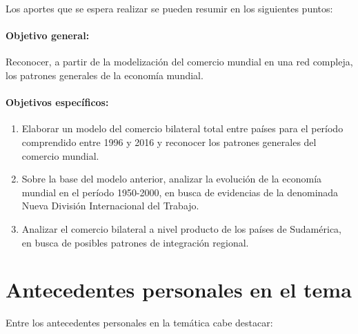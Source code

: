 \documentclass[runningheads,a4paper]{llncs}
\begin{document}
Los aportes que se espera realizar se pueden resumir en los siguientes puntos:

\par

\paragraph{\textbf{Objetivo general:}} Reconocer, a partir de la modelización del comercio mundial en una red compleja, los patrones generales de la economía mundial.

\par

\paragraph{\textbf{Objetivos específicos:}}

\begin{enumerate}
	\item Elaborar un modelo del comercio bilateral total entre países para el período comprendido entre 1996 y 2016 y reconocer los patrones generales del comercio mundial.
	\item Sobre la base del modelo anterior, analizar la evolución de la economía mundial en el período 1950-2000, en busca de evidencias de la denominada Nueva División Internacional del Trabajo.
	\item Analizar el comercio bilateral a nivel producto de los países de Sudamérica, en busca de posibles patrones de integración regional.
\end{enumerate}


\section{Antecedentes personales en el tema}

Entre los antecedentes personales en la temática cabe destacar:
\end{document}
